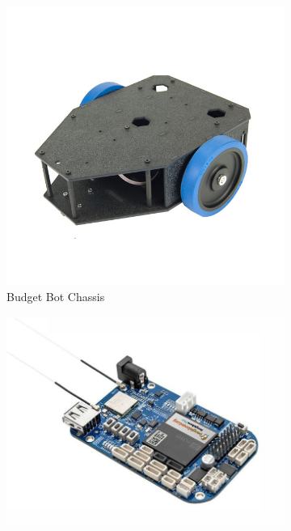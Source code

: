\begin{figure}
  \centering
  \begin{subfigure}[t]{0.32\linewidth}
    \includegraphics[width=1\linewidth]{figs/img/budgetbot_chassis}
    \captionsetup{width=\linewidth}
    \caption{Budget Bot Chassis}
    \label{fig:budgetBotChassis}
  \end{subfigure}
  \begin{subfigure}[t]{0.32\linewidth}
    \includegraphics[width=1\linewidth]{figs/img/beaglebone_blue}

\end{subfigure}
\end{figure}

